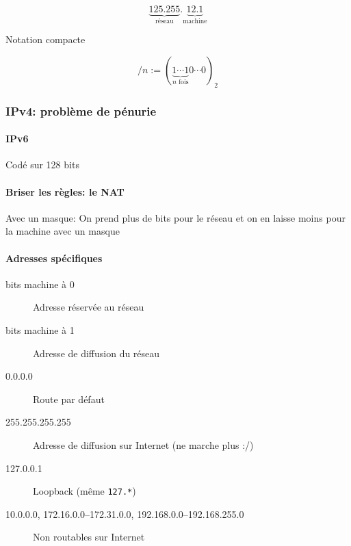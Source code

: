 \documentclass{article}
\begin{document}
\[
	\underbrace{125.255}_{\text{réseau}}.\underbrace{12.1}_{\text{machine}}
\] 

Notation compacte

\[
	/n := (\underbrace{1\cdots 1}_{\text{$n$ fois}} 0 \cdots 0)_2
\] 
\subsubsection{IPv4: problème de pénurie}

\paragraph{IPv6}
 Codé sur 128 bits

 \paragraph{Briser les règles: le NAT}
 Avec un masque: On prend plus de bits pour le réseau et on en laisse moins pour la machine avec un masque 

 \paragraph{Adresses spécifiques}

 \begin{description}
	 \item[bits machine à 0] Adresse réservée au réseau
	\item[bits machine à 1] Adresse de diffusion du réseau
 	\item[0.0.0.0] Route par défaut
	\item[255.255.255.255] Adresse de diffusion sur Internet (ne marche plus :/)
	\item[127.0.0.1] Loopback (même \verb|127.*|)
	\item[10.0.0.0, 172.16.0.0--172.31.0.0, 192.168.0.0--192.168.255.0]  Non routables sur Internet
 \end{description}
 
 
\end{document}

